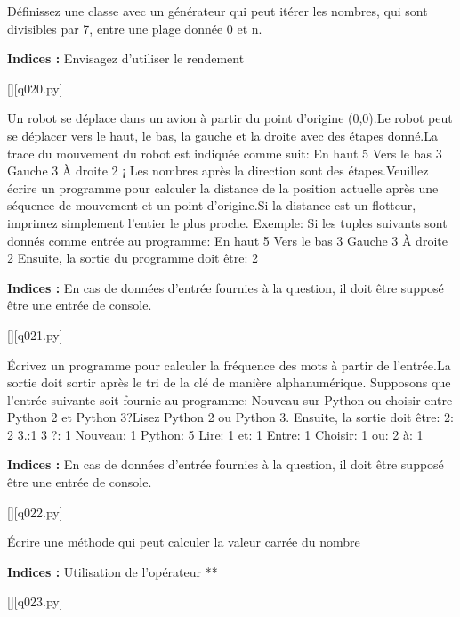 \question
Définissez une classe avec un générateur qui peut itérer les nombres, qui sont divisibles par 7, entre une plage donnée 0 et n.
\par
\textbf{Indices : }Envisagez d'utiliser le rendement
\renewcommand{\nomfichier}{q020.py}
\begin{solution}
    \pythonfile{\chemincode \nomfichier}[][q020.py]
\end{solution}


\question
Un robot se déplace dans un avion à partir du point d'origine (0,0).Le robot peut se déplacer vers le haut, le bas, la gauche et la droite avec des étapes donné.La trace du mouvement du robot est indiquée comme suit:
En haut 5
Vers le bas 3
Gauche 3
À droite 2
¡
Les nombres après la direction sont des étapes.Veuillez écrire un programme pour calculer la distance de la position actuelle après une séquence de mouvement et un point d'origine.Si la distance est un flotteur, imprimez simplement l'entier le plus proche.
Exemple:
Si les tuples suivants sont donnés comme entrée au programme:
En haut 5
Vers le bas 3
Gauche 3
À droite 2
Ensuite, la sortie du programme doit être:
2
\par
\textbf{Indices : }En cas de données d'entrée fournies à la question, il doit être supposé être une entrée de console.
\renewcommand{\nomfichier}{q021.py}
\begin{solution}
    \pythonfile{\chemincode \nomfichier}[][q021.py]
\end{solution}


\question
Écrivez un programme pour calculer la fréquence des mots à partir de l'entrée.La sortie doit sortir après le tri de la clé de manière alphanumérique.
Supposons que l'entrée suivante soit fournie au programme:
Nouveau sur Python ou choisir entre Python 2 et Python 3?Lisez Python 2 ou Python 3.
Ensuite, la sortie doit être:
2: 2
3.:1
3 ?: 1
Nouveau: 1
Python: 5
Lire: 1
et: 1
Entre: 1
Choisir: 1
ou: 2
à: 1
\par
\textbf{Indices : }En cas de données d'entrée fournies à la question, il doit être supposé être une entrée de console.
\renewcommand{\nomfichier}{q022.py}
\begin{solution}
    \pythonfile{\chemincode \nomfichier}[][q022.py]
\end{solution}


\question
Écrire une méthode qui peut calculer la valeur carrée du nombre
\par
\textbf{Indices : }Utilisation de l'opérateur **
\renewcommand{\nomfichier}{q023.py}
\begin{solution}
    \pythonfile{\chemincode \nomfichier}[][q023.py]
\end{solution}


